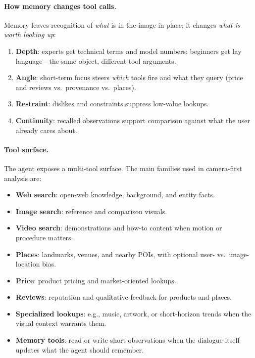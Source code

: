 \documentclass[11pt,a4paper]{article}
\begin{document}
\paragraph{How memory changes tool calls.}
Memory leaves recognition of \emph{what} is in the image in place; it changes \emph{what is worth looking up}:
\begin{enumerate}[leftmargin=*]
    \item \textbf{Depth}: experts get technical terms and model numbers; beginners get lay language---the same object, different tool arguments.
    \item \textbf{Angle}: short-term focus steers \emph{which} tools fire and what they query (price and reviews vs.\ provenance vs.\ places).
    \item \textbf{Restraint}: dislikes and constraints suppress low-value lookups.
    \item \textbf{Continuity}: recalled observations support comparison against what the user already cares about.
\end{enumerate}

\paragraph{Tool surface.}
The agent exposes a multi-tool surface. The main families used in camera-first analysis are:

\begin{itemize}[leftmargin=*]
    \item \textbf{Web search}: open-web knowledge, background, and entity facts.
    \item \textbf{Image search}: reference and comparison visuals.
    \item \textbf{Video search}: demonstrations and how-to content when motion or procedure matters.
    \item \textbf{Places}: landmarks, venues, and nearby POIs, with optional user- vs.\ image-location bias.
    \item \textbf{Price}: product pricing and market-oriented lookups.
    \item \textbf{Reviews}: reputation and qualitative feedback for products and places.
    \item \textbf{Specialized lookups}: e.g., music, artwork, or short-horizon trends when the visual context warrants them.
    \item \textbf{Memory tools}: read or write short observations when the dialogue itself updates what the agent should remember.
\end{itemize}
\end{document}
